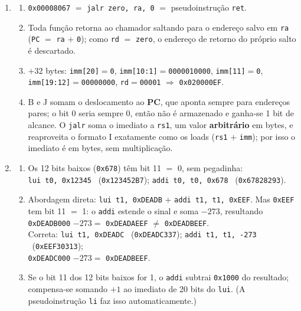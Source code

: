 \documentclass[11pt, a4paper]{article}
\begin{document}
\begin{enumerate}
\item \begin{enumerate}
  \item \texttt{0x00008067} $=$ \texttt{jalr zero, ra, 0} $=$ pseudoinstru\c{c}\~{a}o \texttt{ret}.
  \item Toda fun\c{c}\~{a}o retorna ao chamador saltando para o endere\c{c}o salvo em \texttt{ra} (\texttt{PC} $=$ \texttt{ra} $+$ \texttt{0}); como \texttt{rd} $=$ \texttt{zero}, o endere\c{c}o de retorno do pr\'{o}prio salto \'{e} descartado.
  \item $+32$ bytes: \texttt{imm[20]}$=$\texttt{0}, \texttt{imm[10:1]}$=$\texttt{0000010000}, \texttt{imm[11]}$=$\texttt{0}, \texttt{imm[19:12]}$=$\texttt{00000000}, \texttt{rd}$=$\texttt{00001} $\Rightarrow$ \texttt{0x020000EF}.
  \item B e J somam o deslocamento ao \textbf{PC}, que aponta sempre para endere\c{c}os pares; o bit 0 seria sempre 0, ent\~{a}o n\~{a}o \'{e} armazenado e ganha-se 1 bit de alcance. O \texttt{jalr} soma o imediato a \texttt{rs1}, um valor \textbf{arbitr\'{a}rio} em bytes, e reaproveita o formato I exatamente como os loads (\texttt{rs1} $+$ \texttt{imm}); por isso o imediato \'{e} em bytes, sem multiplica\c{c}\~{a}o.
\end{enumerate}

\item \begin{enumerate}
  \item Os 12 bits baixos (\texttt{0x678}) t\^{e}m bit 11 $=$ 0, sem pegadinha:\\
  \texttt{lui t0, 0x12345} \ (\texttt{0x123452B7}); \quad \texttt{addi t0, t0, 0x678} \ (\texttt{0x67828293}).
  \item Abordagem direta: \texttt{lui t1, 0xDEADB} $+$ \texttt{addi t1, t1, 0xEEF}. Mas \texttt{0xEEF} tem bit 11 $=$ 1: o \texttt{addi} estende o sinal e soma $-273$, resultando \texttt{0xDEADB000} $- 273 =$ \texttt{0xDEADAEEF} $\neq$ \texttt{0xDEADBEEF}.\\
  Correta: \texttt{lui t1, 0xDEADC} \ (\texttt{0xDEADC337}); \quad \texttt{addi t1, t1, -273} \ (\texttt{0xEEF30313});\\
  \texttt{0xDEADC000} $- 273 =$ \texttt{0xDEADBEEF}.
  \item Se o bit 11 dos 12 bits baixos for 1, o \texttt{addi} subtrai \texttt{0x1000} do resultado; compensa-se somando $+1$ ao imediato de 20 bits do \texttt{lui}. (A pseudoinstru\c{c}\~{a}o \texttt{li} faz isso automaticamente.)
\end{enumerate}


\end{enumerate}
\end{document}

